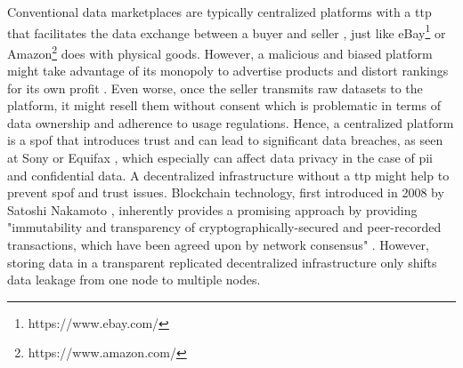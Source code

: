 Conventional data marketplaces are typically centralized platforms with a \acrfull{ttp} that facilitates the data exchange between a buyer and seller \cite{daiSDTESecureBlockchainBased2020}, just like eBay\footnote{https://www.ebay.com/} or Amazon\footnote{https://www.amazon.com/} does with physical goods. However, a malicious and biased platform might take advantage of its monopoly to advertise products and distort rankings for its own profit \cite{ramachandranDecentralizedDataMarketplace2018}. Even worse, once the seller transmits raw datasets to the platform, it might resell them without consent \cite{suBDTFBlockchainBasedData2020,serranoPeertoPeerOwnershipPreservingData2021,daiSDTESecureBlockchainBased2020,banerjeeBlockchainEnabledData2019} which is problematic in terms of data ownership and adherence to usage regulations. Hence, a centralized platform is a \acrfull{spof} that introduces trust and can lead to significant data breaches, as seen at Sony \cite{sullivan2014SonyHack2014} or Equifax \cite{zouVeGotNothing}, which especially can affect data privacy in the case of \acrshort{pii} and confidential data. A decentralized infrastructure without a \acrshort{ttp} might help to prevent \acrshort{spof} and trust issues. Blockchain technology, first introduced in 2008 by Satoshi Nakamoto \cite{nakamotoBitcoinPeertoPeerElectronic}, inherently provides a promising approach by providing "immutability and transparency of cryptographically-secured and peer-recorded transactions, which have been agreed upon by network consensus" \cite{eberhardtBlockchainInsightsOffChaining2017}. However, storing data in a transparent replicated decentralized infrastructure only shifts data leakage from one node to multiple nodes.


